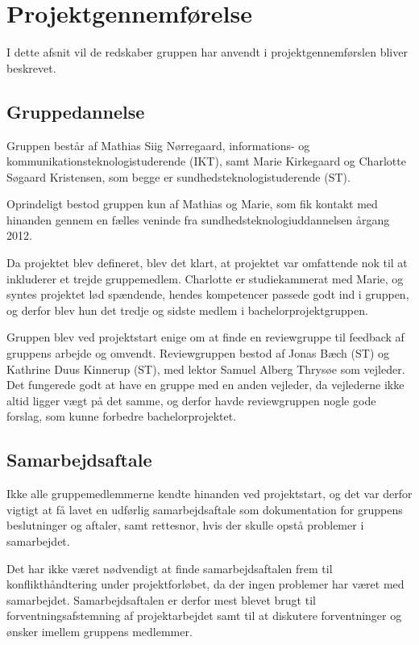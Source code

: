\chapter{Projektgennemførelse}\label{kapitel_Projektgennemforelse}
I dette afsnit vil de redskaber gruppen har anvendt i projektgennemførslen bliver beskrevet. 

\section{Gruppedannelse}
Gruppen består af Mathias Siig Nørregaard, informations- og kommunikationsteknologistuderende (IKT), samt Marie Kirkegaard og Charlotte Søgaard Kristensen, som begge er sundhedsteknologistuderende (ST). 

Oprindeligt bestod gruppen kun af Mathias og Marie, som fik kontakt med hinanden gennem en fælles veninde fra sundhedsteknologiuddannelsen årgang 2012.

Da projektet blev defineret, blev det klart, at  projektet var omfattende nok til at inkluderer et trejde gruppemedlem. Charlotte er studiekammerat med Marie, og syntes projektet lød spændende, hendes kompetencer passede godt ind i gruppen, og derfor blev hun det tredje og sidste medlem i bachelorprojektgruppen. 

Gruppen blev ved projektstart enige om at finde en reviewgruppe til feedback af gruppens arbejde og omvendt. Reviewgruppen bestod af Jonas Bæch (ST) og Kathrine Duus Kinnerup (ST), med lektor Samuel Alberg Thrysøe som vejleder. Det fungerede godt at have en gruppe med en anden vejleder, da vejlederne ikke altid ligger vægt på det samme, og derfor havde reviewgruppen nogle gode forslag, som kunne forbedre bachelorprojektet.  

\section{Samarbejdsaftale}
Ikke alle gruppemedlemmerne kendte hinanden ved projektstart, og det var derfor vigtigt at få lavet en udførlig samarbejdsaftale som dokumentation for gruppens beslutninger og aftaler, samt rettesnor, hvis der skulle opstå problemer i samarbejdet. 

Det har ikke været nødvendigt at finde samarbejdsaftalen frem til konflikthåndtering under projektforløbet, da der ingen problemer har været med samarbejdet. Samarbejdsaftalen er derfor mest blevet brugt til forventningsafstemning af projektarbejdet samt til at diskutere forventninger og ønsker imellem gruppens medlemmer. 

